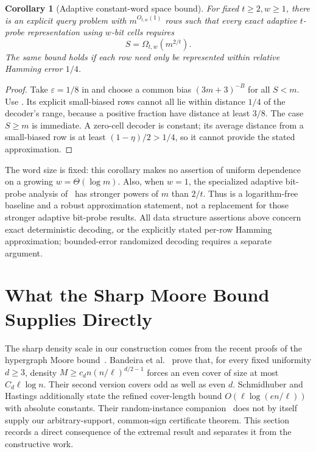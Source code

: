 \documentclass[letterpaper,11pt]{article}
\newtheorem{corollary}[theorem]{Corollary}
\theoremstyle{definition}
\begin{document}
\begin{corollary}[Adaptive constant-word space bound]
\label{cor:wordprobe}
For fixed $t\ge2,w\ge1$, there is an explicit query problem with
$m^{O_{t,w}(1)}$ rows such that every exact adaptive $t$-probe
representation using $w$-bit cells requires
\[
 S=\Omega_{t,w}(m^{2/t}).
\]
The same bound holds if each row need only be represented within
relative Hamming error $1/4$.
\end{corollary}
\begin{proof}
Take $\varepsilon=1/8$ in  and choose a common
bias $(3m+3)^{-B}$ for all $S<m$. Use .
Its explicit small-biased rows
cannot all lie within distance $1/4$ of the decoder's range,
because a positive fraction have distance at least $3/8$.
The case $S\ge m$ is immediate. A zero-cell decoder is constant;
its average distance from a small-biased row is at least
$(1-\eta)/2>1/4$, so it cannot provide the stated approximation.
\end{proof}

The word size is fixed: this corollary makes no assertion of uniform
dependence on a growing $w=\Theta(\log m)$. Also, when $w=1$, the
specialized adaptive bit-probe analysis of~\cite[Section~5.2]{GLY26}
has stronger powers of $m$ than $2/t$. Thus 
is a logarithm-free baseline and a robust approximation statement,
not a replacement for those stronger adaptive bit-probe results.
All data structure assertions above concern exact deterministic
decoding, or the explicitly stated per-row Hamming approximation;
bounded-error randomized decoding requires a separate argument.

\section{What the Sharp Moore Bound Supplies Directly}
\label{sec:moore-applications}

The sharp density scale in our construction comes from the recent
proofs of the hypergraph Moore bound~\cite{BKNPW26,SH26Moore}.
Bandeira et al.~\cite[Theorem~1.2, version~2]{BKNPW26} prove that,
for every fixed uniformity $d\ge3$, density
$M\ge c_d n(n/\ell)^{d/2-1}$ forces an even cover of size
at most $C_d\ell\log n$. Their second version
covers odd as well as even $d$.
Schmidhuber and Hastings additionally state the
refined cover-length bound $O(\ell\log(en/\ell))$ with absolute
constants. Their random-instance companion~\cite{SH26Kikuchi}
does not by itself supply our arbitrary-support, common-sign
certificate theorem. This section records a direct consequence of
the extremal result and separates it from the constructive work.
\end{document}
